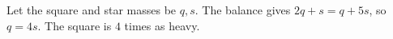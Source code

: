Let the square and star masses be $q,s$. The balance gives $2q+s=q+5s$, so $q=4s$. The square is $\boxed4$ times as heavy.
